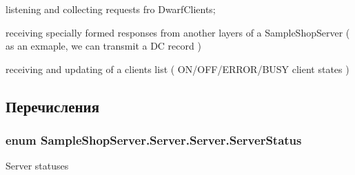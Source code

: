 \begin{DoxyItemize}
\item listening and collecting requests fro Dwarf\+Clients;
\item receiving specially formed responses from another layers of a Sample\+Shop\+Server ( as an exmaple, we can transmit a D\+C record )
\item receiving and updating of a clients list ( O\+N/\+O\+F\+F/\+E\+R\+R\+O\+R/\+B\+U\+S\+Y client states ) 
\end{DoxyItemize}

\subsection{Перечисления}
\hypertarget{class_sample_shop_server_1_1_server_1_1_server_a0b89d20b2f19ee5580acbbc73887bb6b}{}
\subsubsection[{Server\+Status}]{\setlength{\rightskip}{0pt plus 5cm}enum {\bf Sample\+Shop\+Server.\+Server.\+Server.\+Server\+Status}\hspace{0.3cm}{\ttfamily [strong]}}\label{class_sample_shop_server_1_1_server_1_1_server_a0b89d20b2f19ee5580acbbc73887bb6b}


Server statuses 

